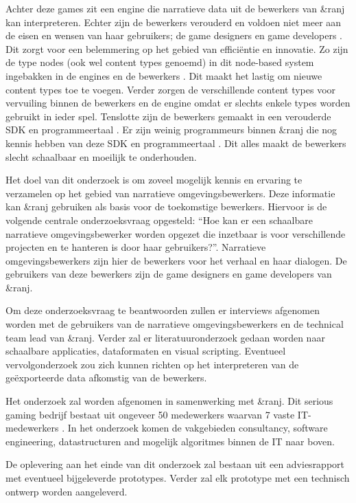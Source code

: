 \documentclass{report}
\newcommand{\organisation}{\&ranj}
\begin{document}
Achter deze games zit een engine die narratieve data uit de bewerkers van \organisation{} kan interpreteren. Echter zijn de bewerkers verouderd en voldoen niet meer aan de eisen en wensen van haar gebruikers; de game designers en game developers \cite{interviewivo}. Dit zorgt voor een belemmering op het gebied van effici{\"e}ntie en innovatie. Zo zijn de type nodes (ook wel content types genoemd) in dit node-based system ingebakken in de engines en de bewerkers \cite{interviewivo}. Dit maakt het lastig om nieuwe content types toe te voegen. Verder zorgen de verschillende content types voor vervuiling binnen de bewerkers en de engine omdat er slechts enkele types worden gebruikt in ieder spel. Tenslotte zijn de bewerkers gemaakt in een verouderde SDK en programmeertaal \cite{interviewivo}. Er zijn weinig programmeurs binnen \organisation{} die nog kennis hebben van deze SDK en programmeertaal \cite{interviewivo}. Dit alles maakt de bewerkers slecht schaalbaar en moeilijk te onderhouden.

Het doel van dit onderzoek is om zoveel mogelijk kennis en ervaring te verzamelen op het gebied van narratieve omgevingsbewerkers. Deze informatie kan \organisation{} gebruiken als basis voor de toekomstige bewerkers. Hiervoor is de volgende centrale onderzoeksvraag opgesteld: ``Hoe kan er een schaalbare narratieve omgevingsbewerker worden opgezet die inzetbaar is voor verschillende projecten en te hanteren is door haar gebruikers?''. Narratieve omgevingsbewerkers zijn hier de bewerkers voor het verhaal en haar dialogen. De gebruikers van deze bewerkers zijn de game designers en game developers van \organisation.

Om deze onderzoeksvraag te beantwoorden zullen er interviews afgenomen worden met de gebruikers van de narratieve omgevingsbewerkers en de technical team lead van \organisation. Verder zal er literatuuronderzoek gedaan worden naar schaalbare applicaties, dataformaten en visual scripting. Eventueel vervolgonderzoek zou zich kunnen richten op het interpreteren van de ge{\"e}xporteerde data afkomstig van de bewerkers.

Het onderzoek zal worden afgenomen in samenwerking met \organisation. Dit serious gaming bedrijf bestaat uit ongeveer 50 medewerkers waarvan 7 vaste IT-medewerkers \cite{linkedinranj}. In het onderzoek komen de vakgebieden consultancy, software engineering, datastructuren and mogelijk algoritmes binnen de IT naar boven.

De oplevering aan het einde van dit onderzoek zal bestaan uit een adviesrapport met eventueel bijgeleverde prototypes. Verder zal elk prototype met een technisch ontwerp worden aangeleverd.
\end{document}

